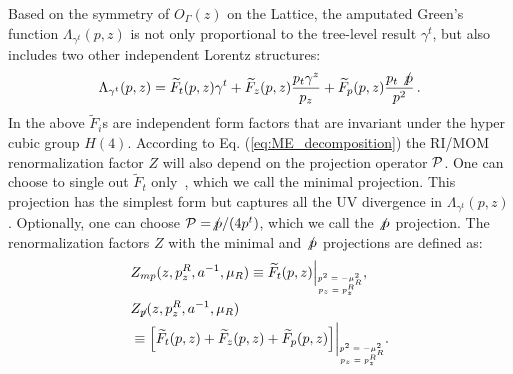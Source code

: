 Based on the symmetry of $O_\Gamma(z)$ on the Lattice, the amputated Green's function $\Lambda_{\gamma^t}(p,z)$ is not only proportional to the tree-level result $\gamma^t$, but also includes two other independent Lorentz structures:
\begin{equation}\label{eq:ME_decomposition}
\Lambda_{\gamma^t}(p,z)=\widetilde{F}_t(p,z) \gamma^t  + \widetilde{F}_{z}(p,z)\frac{p_t\gamma^z}{p_z} +\widetilde{F}_p(p,z)\frac{p_t\slashed{p}}{p^2}\,.
\end{equation}
In the above $\widetilde{F}_i$s are independent  form factors that are invariant under the hyper cubic group $H(4)$. According to Eq. (\ref{eq:ME_decomposition}) the RI/MOM renormalization factor $Z$ will also depend on  the projection operator ${\cal P}$. One can choose to single out  $\widetilde{F}_t$ only~\cite{Stewart:2017tvs}, which we call the minimal projection. This projection  has the simplest form but captures all the UV divergence in $\Lambda_{\gamma^t}(p,z)$. Optionally, one  can choose ${\cal P} = \slashed p/(4p^t)$, which we call the $\slashed p$ projection. The renormalization factors $Z$ with the minimal and $\slashed p$ projections are defined as: 
\begin{align}\label{eq:def_renorm}
&Z_{mp}(z, p^R_z, a^{-1}, \mu_R)\equiv \widetilde{F}_t(p,z)\Big|_{\tiny\begin{matrix}p^2=-\mu_R^2 \\ \!\!\!\!p_z=p^R_z\end{matrix}},\\
&Z_{\slashed{p}}(z, p^R_z, a^{-1}, \mu_R)\nonumber\\
&\equiv \Big[\widetilde{F}_t(p,z)+\widetilde{F}_z(p,z)+\widetilde{F}_p(p,z)\Big]\bigg|_{\tiny\begin{matrix}p^2=-\mu_R^2 \\ \!\!\!\!p_z=p^R_z\end{matrix}}.
\end{align}

